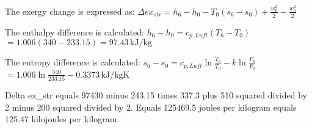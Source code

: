 The exergy change is expressed as:  
\( \Delta ex_{str} = h_6 - h_0 - T_0 (s_6 - s_0) + \frac{w_6^2}{2} - \frac{w_0^2}{2} \)  

The enthalpy difference is calculated:  
\( h_6 - h_0 = c_{p,Luft} (T_6 - T_0) \)  
\( = 1.006 (340 - 233.15) = 97.43 \, \text{kJ/kg} \)  

The entropy difference is calculated:  
\( s_6 - s_0 = c_{p,Luft} \ln \frac{T_6}{T_0} - k \ln \frac{P_6}{P_0} \)  
\( = 1.006 \ln \frac{340}{233.15} - 0.3373 \, \text{kJ/kgK} \)

Delta ex_str equals 97430 minus 243.15 times 337.3 plus 510 squared divided by 2 minus 200 squared divided by 2.  
Equals 125469.5 joules per kilogram equals 125.47 kilojoules per kilogram.